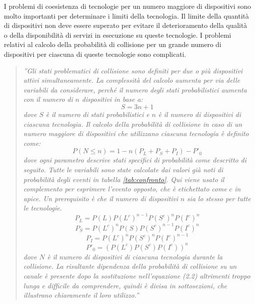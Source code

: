 \documentclass[a4paper]{report} %
\begin{document}
I problemi di coesistenza di tecnologie per un numero maggiore di dispositivi sono molto importanti per determinare i limiti della tecnologia. Il limite della quantità di dispositivi non deve essere superato per evitare il deterioramento della qualità o della disponibilità di servizi in esecuzione su queste tecnologie. 
I problemi relativi al calcolo della probabilità di collisione per un grande numero di dispositivi per ciascuna di queste tecnologie sono complicati. 
\begin{quote}
	\textit{''Gli stati problematici di collisione sono definiti per due o più dispositivi attivi simultaneamente. La complessità del calcolo aumenta per via delle variabili da considerare, perché il numero degli stati probabilistici aumenta con il numero di $n$ dispositivi in base a:
	\begin{equation}
	S = 3n + 1
	\end{equation}
	dove $S$ è il numero di stati probabilistici e $n$ è il numero di dispositivi di ciascuna tecnologia. Il calcolo della probabilità di collisione in caso di un numero maggiore di dispositivi che utilizzano ciascuna tecnologia è definito come:
	\begin{equation}
	P(N \leq n) = 1 - n(P_L + P_S + P_I) - P'_0
	\end{equation}
	dove ogni parametro descrive stati specifici di probabilità come descritto di seguito. Tutte le variabili sono state calcolate dai valori già noti di probabilità degli eventi in tabella \ref{tab:confronto}. Qui viene usato il complemento per esprimere l'evento opposto, che è etichettato come $c$ in apice. Un prerequisito è che il numero di dispositivi $n$ sia lo stesso per tutte le tecnologie.
	\begin{equation}
	P_L = P(L)P(L^c)^{n-1}P(S^c)^nP(I^c)^n
	\end{equation}
	\begin{equation}
	P_S = P(L^c)^nP(S)P(S^c)^{n-1}P(I^c)^n
	\end{equation}
	\begin{equation}
	P_I = P(L^c)^nP(S^c)^nP(I^c)^{n-1}
	\end{equation}
	\begin{equation}
	P'_0 = (P(L^c)P(S^c)P(I^c))^n
	\end{equation}
	dove $N$ è il numero di dispositivi di ciascuna tecnologia durante la collisione. La risultante dipendenza della probabilità di collisione su un canale è presente dopo la sostituzione nell'equazione (2.2) altrimenti troppo lunga e difficile da comprendere, quindi è divisa in sottosezioni, che illustrano chiaramente il loro utilizzo.''}
\end{quote}
\end{document}
